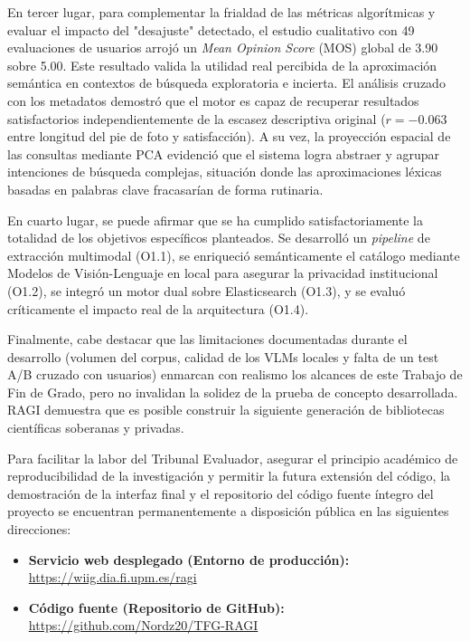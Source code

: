 \documentclass[a4paper]{report}
\begin{document}
En tercer lugar, para complementar la frialdad de las métricas algorítmicas y evaluar el impacto del "desajuste" detectado, el estudio cualitativo con 49 evaluaciones de usuarios arrojó un \textit{Mean Opinion Score} (MOS) global de 3.90 sobre 5.00. Este resultado valida la utilidad real percibida de la aproximación semántica en contextos de búsqueda exploratoria e incierta. El análisis cruzado con los metadatos demostró que el motor es capaz de recuperar resultados satisfactorios independientemente de la escasez descriptiva original ($r = -0.063$ entre longitud del pie de foto y satisfacción). A su vez, la proyección espacial de las consultas mediante PCA evidenció que el sistema logra abstraer y agrupar intenciones de búsqueda complejas, situación donde las aproximaciones léxicas basadas en palabras clave fracasarían de forma rutinaria.

En cuarto lugar, se puede afirmar que se ha cumplido satisfactoriamente la totalidad de los objetivos específicos planteados. Se desarrolló un \textit{pipeline} de extracción multimodal (O1.1), se enriqueció semánticamente el catálogo mediante Modelos de Visión-Lenguaje en local para asegurar la privacidad institucional (O1.2), se integró un motor dual sobre Elasticsearch (O1.3), y se evaluó críticamente el impacto real de la arquitectura (O1.4).

Finalmente, cabe destacar que las limitaciones documentadas durante el desarrollo (volumen del corpus, calidad de los VLMs locales y falta de un test A/B cruzado con usuarios) enmarcan con realismo los alcances de este Trabajo de Fin de Grado, pero no invalidan la solidez de la prueba de concepto desarrollada. RAGI demuestra que es posible construir la siguiente generación de bibliotecas científicas soberanas y privadas.

Para facilitar la labor del Tribunal Evaluador, asegurar el principio académico de reproducibilidad de la investigación y permitir la futura extensión del código, la demostración de la interfaz final y el repositorio del código fuente íntegro del proyecto se encuentran permanentemente a disposición pública en las siguientes direcciones:
\begin{itemize}
    \item \textbf{Servicio web desplegado (Entorno de producción):} \url{https://wiig.dia.fi.upm.es/ragi}
    \item \textbf{Código fuente (Repositorio de GitHub):} \url{https://github.com/Nordz20/TFG-RAGI}
\end{itemize}
\end{document}
